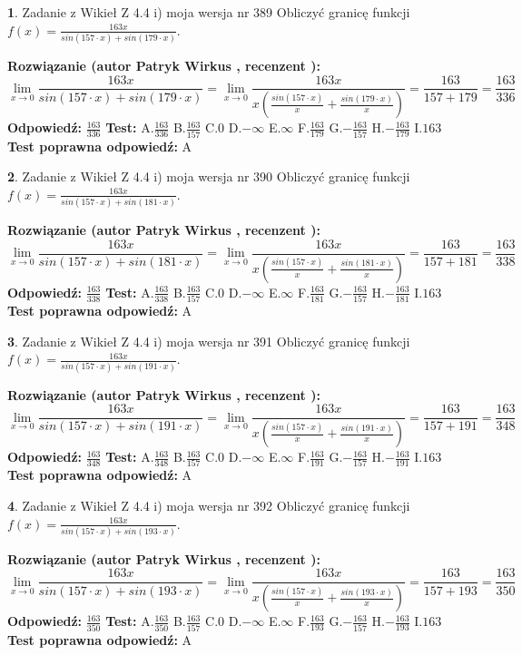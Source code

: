 \documentclass[12pt, a4paper]{article}
\theoremstyle{definition} %
\newtheorem{zad}{}
\newcommand{\zadStart}[1]{\begin{zad}#1\newline}
\newcommand{\zadStop}{\end{zad}}
\newcommand{\rozwStart}[2]{\noindent \textbf{Rozwiązanie (autor #1 , recenzent #2): }\newline}
\newcommand{\rozwStop}{\newline}
\newcommand{\odpStart}{\noindent \textbf{Odpowiedź:}\newline}
\newcommand{\odpStop}{\newline}
\newcommand{\testStart}{\noindent \textbf{Test:}\newline}
\newcommand{\testStop}{\newline}
\newcommand{\kluczStart}{\noindent \textbf{Test poprawna odpowiedź:}\newline}
\newcommand{\kluczStop}{\newline}
\begin{document}
\zadStart{Zadanie z Wikieł Z 4.4 i) moja wersja nr 389}
Obliczyć granicę funkcji $f(x)=\frac{163x}{sin(157\cdot x) +sin(179\cdot x)}$.
\zadStop
\rozwStart{Patryk Wirkus}{}
$$\lim\limits_{x\to 0}\frac{163x}{sin(157\cdot x) +sin(179\cdot x)}=\lim\limits_{x\to 0}\frac{163x}{x(\frac{sin(157\cdot x)}{x}+\frac{sin(179\cdot x)}{x})}=\frac{163}{157+179} = \frac{163}{336}$$
\rozwStop
\odpStart
$\frac{163}{336}$
\odpStop
\testStart
A.$\frac{163}{336}$
B.$\frac{163}{157}$
C.$0$
D.$-\infty$
E.$\infty$
F.$\frac{163}{179}$
G.$-\frac{163}{157}$
H.$-\frac{163}{179}$
I.$163$
\testStop
\kluczStart
A
\kluczStop



\zadStart{Zadanie z Wikieł Z 4.4 i) moja wersja nr 390}
Obliczyć granicę funkcji $f(x)=\frac{163x}{sin(157\cdot x) +sin(181\cdot x)}$.
\zadStop
\rozwStart{Patryk Wirkus}{}
$$\lim\limits_{x\to 0}\frac{163x}{sin(157\cdot x) +sin(181\cdot x)}=\lim\limits_{x\to 0}\frac{163x}{x(\frac{sin(157\cdot x)}{x}+\frac{sin(181\cdot x)}{x})}=\frac{163}{157+181} = \frac{163}{338}$$
\rozwStop
\odpStart
$\frac{163}{338}$
\odpStop
\testStart
A.$\frac{163}{338}$
B.$\frac{163}{157}$
C.$0$
D.$-\infty$
E.$\infty$
F.$\frac{163}{181}$
G.$-\frac{163}{157}$
H.$-\frac{163}{181}$
I.$163$
\testStop
\kluczStart
A
\kluczStop



\zadStart{Zadanie z Wikieł Z 4.4 i) moja wersja nr 391}
Obliczyć granicę funkcji $f(x)=\frac{163x}{sin(157\cdot x) +sin(191\cdot x)}$.
\zadStop
\rozwStart{Patryk Wirkus}{}
$$\lim\limits_{x\to 0}\frac{163x}{sin(157\cdot x) +sin(191\cdot x)}=\lim\limits_{x\to 0}\frac{163x}{x(\frac{sin(157\cdot x)}{x}+\frac{sin(191\cdot x)}{x})}=\frac{163}{157+191} = \frac{163}{348}$$
\rozwStop
\odpStart
$\frac{163}{348}$
\odpStop
\testStart
A.$\frac{163}{348}$
B.$\frac{163}{157}$
C.$0$
D.$-\infty$
E.$\infty$
F.$\frac{163}{191}$
G.$-\frac{163}{157}$
H.$-\frac{163}{191}$
I.$163$
\testStop
\kluczStart
A
\kluczStop



\zadStart{Zadanie z Wikieł Z 4.4 i) moja wersja nr 392}
Obliczyć granicę funkcji $f(x)=\frac{163x}{sin(157\cdot x) +sin(193\cdot x)}$.
\zadStop
\rozwStart{Patryk Wirkus}{}
$$\lim\limits_{x\to 0}\frac{163x}{sin(157\cdot x) +sin(193\cdot x)}=\lim\limits_{x\to 0}\frac{163x}{x(\frac{sin(157\cdot x)}{x}+\frac{sin(193\cdot x)}{x})}=\frac{163}{157+193} = \frac{163}{350}$$
\rozwStop
\odpStart
$\frac{163}{350}$
\odpStop
\testStart
A.$\frac{163}{350}$
B.$\frac{163}{157}$
C.$0$
D.$-\infty$
E.$\infty$
F.$\frac{163}{193}$
G.$-\frac{163}{157}$
H.$-\frac{163}{193}$
I.$163$
\testStop
\kluczStart
A
\kluczStop
\end{document}
